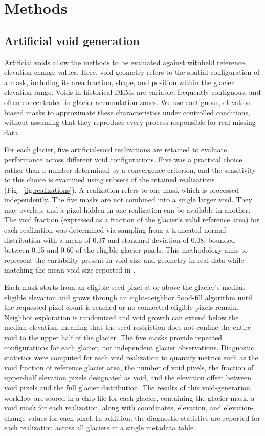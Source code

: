 \documentclass[tc,manuscript]{copernicus}
\begin{document}

\FloatBarrier


\section{Methods}

\subsection{Artificial void generation}
Artificial voids allow the methods to be evaluated against withheld reference elevation-change values. Here, void geometry refers to the spatial configuration of a mask, including its area fraction, shape, and position within the glacier elevation range. Voids in historical DEMs are variable, frequently contiguous, and often concentrated in glacier accumulation zones. We use contiguous, elevation-biased masks to approximate these characteristics under controlled conditions, without assuming that they reproduce every process responsible for real missing data. 

For each glacier, five artificial-void realizations are retained to evaluate performance across different void configurations. Five was a practical choice rather than a number determined by a convergence criterion, and the sensitivity to this choice is examined using subsets of the retained realizations (Fig.~\ref{fig:realizations}). A realization refers to one mask which is processed independently. The five masks are not combined into a single larger void. They may overlap, and a pixel hidden in one realization can be available in another. The void fraction (expressed as a fraction of the glacier's valid reference area) for each realization was determined via sampling from a truncated normal distribution with a mean of 0.37 and standard deviation of 0.08, bounded between 0.15 and 0.60 of the eligible glacier pixels. This methodology aims to represent the variability present in void size and geometry in real data while matching the mean void size reported in \citet{maurer2019}.

Each mask starts from an eligible seed pixel at or above the glacier's median eligible elevation and grows through an eight-neighbor flood-fill algorithm \citep{newman1979} until the requested pixel count is reached or no connected eligible pixels remain. Neighbor exploration is randomized and void growth can extend below the median elevation, meaning that the seed restriction does not confine the entire void to the upper half of the glacier. The five masks provide repeated configurations for each glacier, not independent glacier observations. Diagnostic statistics were computed for each void realization to quantify metrics such as the void fraction of reference glacier area, the number of void pixels, the fraction of upper-half elevation pixels designated as void, and the elevation offset between void pixels and the full glacier distribution. The results of this void-generation workflow are stored in a chip file for each glacier, containing the glacier mask, a void mask for each realization, along with coordinates, elevation, and elevation-change values for each pixel. In addition, the diagnostic statistics are reported for each realization across all glaciers in a single metadata table.
 
\end{document}
